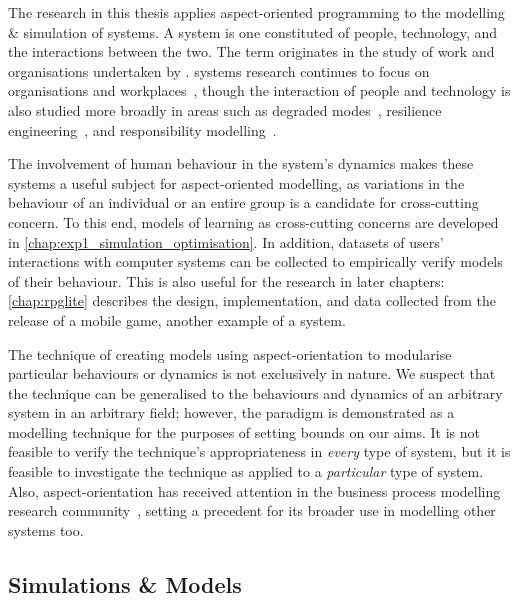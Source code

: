 The research in this thesis applies aspect-oriented programming to the modelling
\& simulation of \sociotechnical systems. A \sociotechnical system is one
constituted of people, technology, and the interactions between the two. The
term originates in the study of work and organisations undertaken by
\citet{trist1951sociotechnical}. \Sociotechnical systems research continues to
focus on organisations and
workplaces~\cite{pasmore2019reflections,baxter2011socio}, though the interaction
of people and technology is also studied more broadly in areas such as degraded
modes~\cite{johnson2007degradedmodes}, resilience
engineering~\cite{hollnagel2006resilience}, and responsibility
modelling~\cite{lock2009responsibility}.

The involvement of human behaviour in the system's dynamics makes these systems
a useful subject for aspect-oriented modelling, as variations in the behaviour
of an individual or an entire group is a candidate for cross-cutting concern. To
this end, models of learning as cross-cutting concerns are developed in
\cref{chap:exp1_simulation_optimisation}. In addition, datasets of users'
interactions with computer systems can be collected to empirically verify models
of their behaviour. This is also useful for the research in later chapters:
\cref{chap:rpglite} describes the design, implementation, and data collected
from the release of a mobile game, another example of a \sociotechnical system.

The technique of creating models using aspect-orientation to modularise
particular behaviours or dynamics is not exclusively \sociotechnical in nature.
We suspect that the technique can be generalised to the behaviours and dynamics
of an arbitrary system in an arbitrary field; however, the paradigm is
demonstrated as a \sociotechnical modelling technique for the purposes of
setting bounds on our aims. It is not feasible to verify the
technique's appropriateness in \emph{every} type of system, but it is feasible to
investigate the technique as applied to a \emph{particular} type of system.
Also, aspect-orientation has received attention in the business process
modelling research
community~\cite{charfi2007ao4bpel,Cappelli_AOBPM,Charfi2006AspectOrientedWL},
setting a precedent for its broader use in modelling other \sociotechnical
systems too.


\subsection{Simulations \& Models}

